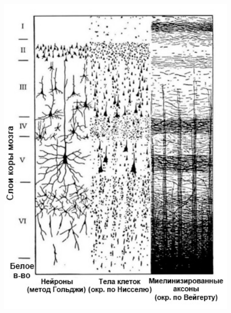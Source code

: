 \documentclass[default]{beamer}
\begin{document}
\begin{frame}
\begin{columns}
\begin{column}{0.5\textwidth}
				\includegraphics[width=0.9\textwidth]{phisio/column_layers_ru}
			\end{column}
		\end{columns}
	\end{frame}
	
\end{document}
